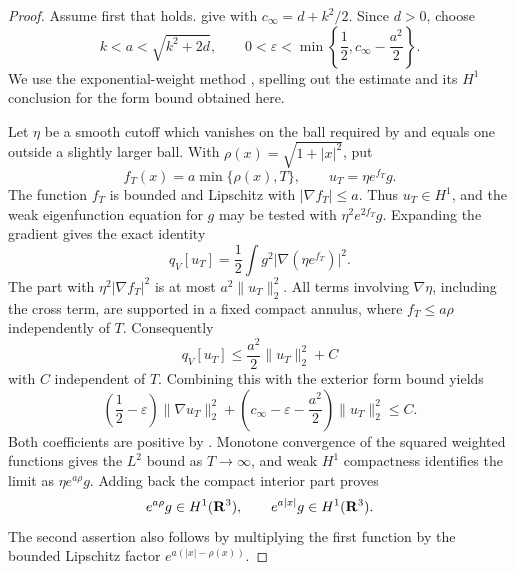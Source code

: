 \begin{proof}
Assume first that  holds.
 give
 with
\(c_\infty=d+k^2/2\).  Since \(d>0\), choose
\begin{equation}
 k<a<\sqrt{k^2+2d},\qquad
 0<\varepsilon<\min\left\{\frac12,
                       c_\infty-\frac{a^2}{2}\right\}.
 \label{eq:agmon-exponent-choice}
\end{equation}
We use the exponential-weight method \cite{Agmon}, spelling out the
estimate and its \(H^1\) conclusion for the form bound obtained here.

Let \(\eta\) be a smooth cutoff which vanishes on the ball required by
 and equals one outside a slightly larger
ball.  With \(\rho(x)=\sqrt{1+|x|^2}\), put
\[
 f_T(x)=a\min\{\rho(x),T\},\qquad
 u_T=\eta e^{f_T}g.
\]
The function \(f_T\) is bounded and Lipschitz with
\(|\nabla f_T|\le a\).  Thus \(u_T\in H^1\), and the weak eigenfunction
equation for \(g\) may be tested with \(\eta^2e^{2f_T}g\).  Expanding
the gradient gives the exact identity
\begin{equation}
 q_V[u_T]=\frac12\int g^2
                    \bigl|\nabla(\eta e^{f_T})\bigr|^2.
 \label{eq:agmon-cutoff-identity}
\end{equation}
The part with \(\eta^2|\nabla f_T|^2\) is at most
\(a^2\|u_T\|_2^2\).  All terms involving \(\nabla\eta\), including
the cross term, are supported in a fixed compact annulus, where
\(f_T\le a\rho\) independently of \(T\).  Consequently
\[
 q_V[u_T]\le\frac{a^2}{2}\|u_T\|_2^2+C
\]
with \(C\) independent of \(T\).  Combining this with the exterior form
bound yields
\[
 \left(\frac12-\varepsilon\right)\|\nabla u_T\|_2^2+
 \left(c_\infty-\varepsilon-\frac{a^2}{2}\right)\|u_T\|_2^2\le C.
\]
Both coefficients are positive by .
Monotone convergence of the squared weighted functions gives the
\(L^2\) bound as \(T\to\infty\), and weak \(H^1\) compactness identifies
the limit as \(\eta e^{a\rho}g\).  Adding back the compact interior part
proves
\begin{equation}
 e^{a\rho}g\in H^1(\mathbf R^3),\qquad
 e^{a|x|}g\in H^1(\mathbf R^3).
 \label{eq:weighted-ground-orbital}
\end{equation}
The second assertion also follows by multiplying the first function by
the bounded Lipschitz factor \(e^{a(|x|-\rho(x))}\).


\end{proof}
